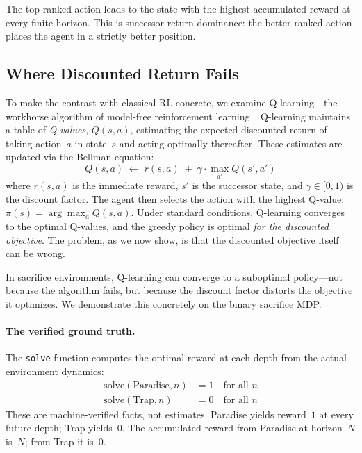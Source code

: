 \documentclass[9pt,a4paper]{article}
\theoremstyle{plain}
\theoremstyle{definition}
\theoremstyle{remark}
\begin{document}
\noindent The top-ranked action leads to the state with the highest accumulated reward at every finite horizon.  This is successor return dominance: the better-ranked action places the agent in a strictly better position.

\subsection{Where Discounted Return Fails}

To make the contrast with classical RL concrete, we examine Q-learning---the workhorse algorithm of model-free reinforcement learning~\cite{Sutton2018}.  Q-learning maintains a table of \emph{Q-values}, $Q(s, a)$, estimating the expected discounted return of taking action~$a$ in state~$s$ and acting optimally thereafter.  These estimates are updated via the Bellman equation:
\[
Q(s, a) \;\leftarrow\; r(s, a) \;+\; \gamma \cdot \max_{a'} Q(s', a')
\]
where $r(s,a)$ is the immediate reward, $s'$ is the successor state, and $\gamma \in [0, 1)$ is the discount factor.  The agent then selects the action with the highest Q-value: $\pi(s) = \arg\max_a Q(s, a)$.  Under standard conditions, Q-learning converges to the optimal Q-values, and the greedy policy is optimal \emph{for the discounted objective}.  The problem, as we now show, is that the discounted objective itself can be wrong.

In sacrifice environments, Q-learning can converge to a suboptimal policy---not because the algorithm fails, but because the discount factor distorts the objective it optimizes.  We demonstrate this concretely on the binary sacrifice MDP.

\paragraph{The verified ground truth.}
The \texttt{solve} function computes the optimal reward at each depth from the actual environment dynamics:
\[
\begin{aligned}
\text{solve}(\text{Paradise}, n) &= 1 \quad \text{for all } n \\
\text{solve}(\text{Trap}, n) &= 0 \quad \text{for all } n
\end{aligned}
\]
These are machine-verified facts, not estimates.  Paradise yields reward~$1$ at every future depth; Trap yields~$0$.  The accumulated reward from Paradise at horizon~$N$ is~$N$; from Trap it is~$0$.
\end{document}
